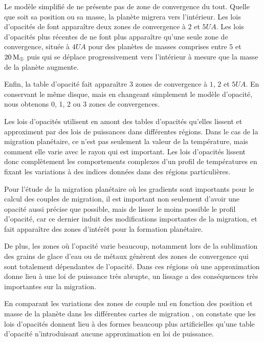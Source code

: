 Le modèle simplifié de \cite{chambers2009analytic} ne présente pas de zone de convergence du tout. Quelle que soit sa position ou sa masse, la planète migrera vers l'intérieur. Les lois d'opacités de \cite{bell1994FU} font apparaître deux zones de convergence à $2$ et $5\unit{UA}$. Les lois d'opacités plus récentes de \cite{zhu2009nonsteady} ne font plus apparaître qu'une seule zone de convergence, située à $4\unit{UA}$ pour des planètes de masses comprises entre $5$ et $20\mathrm{\thinspace M_\oplus}$ puis qui se déplace progressivement vers l'intérieur à mesure que la masse de la planète augmente. 

Enfin, la table d'opacité \cite{hure2000transition} fait apparaître 3 zones de convergence à $1$, $2$ et $5\unit{UA}$. En conservant le même disque, mais en changeant simplement le modèle d'opacité, nous obtenons 0, 1, 2 ou 3 zones de convergences. 

Les lois d'opacités utilisent en amont des tables d'opacités qu'elles lissent et approximent par des lois de puissances dans différentes régions. Dans le cas de la migration planétaire, ce n'est pas seulement la valeur de la température, mais comment elle varie avec le rayon qui est important. Les lois d'opacités lissent donc complètement les comportements complexes d'un profil de températures en fixant les variations à des indices données dans des régions particulières. 

Pour l'étude de la migration planétaire où les gradients sont importants pour le calcul des couples de migration, il est important non seulement d'avoir une opacité aussi précise que possible, mais de lisser le moins possible le profil d'opacité, car ce dernier induit des modifications importantes de la migration, et fait apparaître des zones d'intérêt pour la formation planétaire. 

De plus, les zones où l'opacité varie beaucoup, notamment lors de la sublimation des grains de glace d'eau ou de métaux génèrent des zones de convergence qui sont totalement dépendantes de l'opacité. Dans ces régions où une approximation donne lieu à une loi de puissance très abrupte, un lissage a des conséquences très importantes sur la migration. 

En comparant les variations des zones de couple nul en fonction des position et masse de la planète dans les différentes cartes de migration , on constate que les lois d'opacités \citep{bell1994FU, zhu2009nonsteady, chambers2009analytic} donnent lieu à des formes beaucoup plus artificielles qu'une table d'opacité \citep{hure2000transition} n'introduisant aucune approximation en loi de puissance.

